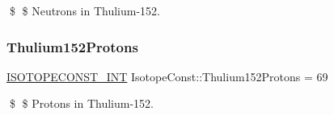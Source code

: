 \$ \$ Neutrons in Thulium-\/152. \mbox{\label{group___isotope_const-_thulium-_tm152_ga10d37109fb47987f1a6aba41a88a65f4}} 
\subsubsection{\texorpdfstring{Thulium152\+Protons}{Thulium152Protons}}
{\footnotesize\ttfamily \mbox{\hyperlink{group___isotope_const-_macros_ga5f18360b3e99483a35c32d789e62621c}{I\+S\+O\+T\+O\+P\+E\+C\+O\+N\+S\+T\+\_\+\+I\+NT}} Isotope\+Const\+::\+Thulium152\+Protons = 69}

\$ \$ Protons in Thulium-\/152. 